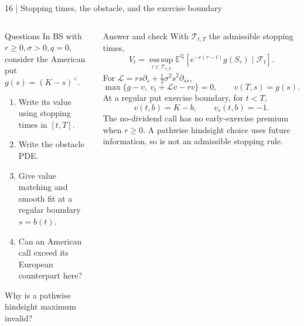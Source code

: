 \documentclass[handout,10pt,t,aspectratio=169]{beamer}
\newcommand{\E}{\mathbb E}
\newcommand{\Q}{\mathbb Q}
\newcommand{\F}{\mathcal F}
\newcommand{\Lbs}{\mathcal L}
\newenvironment{questions}{\begin{block}{Questions}}{\end{block}}
\newenvironment{answers}{\begin{exampleblock}{Answer and check}}{\end{exampleblock}}
\newcommand{\compact}{\small%
 \setlength{\abovedisplayskip}{3pt}%
 \setlength{\belowdisplayskip}{3pt}%
 \setlength{\abovedisplayshortskip}{2pt}%
 \setlength{\belowdisplayshortskip}{2pt}%
 \setlength{\parskip}{2pt}}
\begin{document}
\begin{frame}{16 | Stopping times, the obstacle, and the exercise boundary}
\compact
\begin{columns}[T,onlytextwidth]
\begin{questions}
In BS with \(r\geq0,\sigma>0,q=0\), consider the American put
\(g(s)=(K-s)^+\).
\begin{enumerate}
\item Write its value using stopping times in \([t,T]\).
\item Write the obstacle PDE.
\item Give value matching and smooth fit at a regular boundary \(s=b(t)\).
\item Can an American call exceed its European counterpart here?
\end{enumerate}
Why is a pathwise hindsight maximum invalid?
\end{questions}
\begin{answers}
With \(\mathcal T_{t,T}\) the admissible stopping times,
\[
 V_t=\operatorname*{ess\,sup}_{\tau\in\mathcal T_{t,T}}
 \E^\Q[e^{-r(\tau-t)}g(S_\tau)\mid\F_t].
\]
For \(\Lbs=rs\partial_s+\tfrac12\sigma^2s^2\partial_{ss}\),
\[
 \max\{g-v,\ v_t+\Lbs v-rv\}=0,\qquad
 v(T,s)=g(s).
\]
At a regular put exercise boundary, for \(t<T\),
\[
 v(t,b)=K-b,\qquad v_s(t,b)=-1.
\]
The no-dividend call has no early-exercise premium when \(r\geq0\).
A pathwise hindsight choice uses future information, so is not an
admissible stopping rule.
\end{answers}
\end{columns}
\end{frame}
\end{document}
